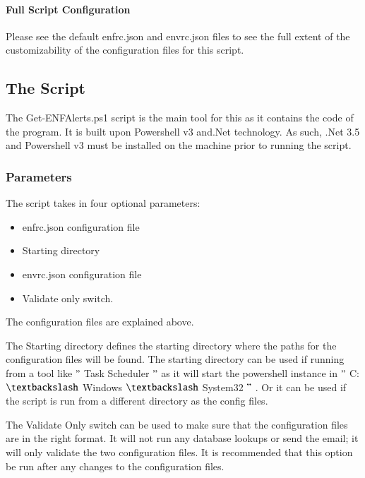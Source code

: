 \documentclass[a4paper,12pt]{report}
\begin{document}
\paragraph*{Full Script Configuration}
 \par
Please see the default enfrc.json and envrc.json files to see the full extent of the customizability of the configuration files for this script. \par
\subsection*{The Script}
 \par
The Get-ENFAlerts.ps1 script is the main tool for this as it contains the code of the program. It is built upon Powershell v3 and.Net technology. As such, .Net 3.5 and Powershell v3 must be installed on the machine prior to running the script.  \par
\subsubsection*{Parameters}
 \par
The script takes in four optional parameters: \par
\begin{itemize}
\item enfrc.json configuration file \par
\item Starting directory \par
\item envrc.json configuration file \par
\item Validate only switch. \par
\end{itemize}
The configuration files are explained above.  \par
The Starting directory defines the starting directory where the paths for the configuration files will be found. The starting directory can be used if running from a tool like  $ " $ Task Scheduler $ " $  as it will start the powershell instance in  $ " $ C: $  \textbackslash  $ Windows $  \textbackslash  $ System32 $ " $ . Or it can be used if the script is run from a different directory as the config files. \par
The Validate Only switch can be used to make sure that the configuration files are in the right format. It will not run any database lookups or send the email; it will only validate the two configuration files. It is recommended that this option be run after any changes to the configuration files. \par
\end{document}

